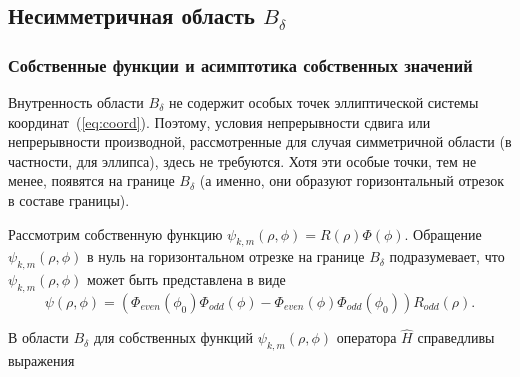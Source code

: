 \subsection{Несимметричная область $B_\delta$}\label{sec:ch2/sec2/sub2}
\subsubsection{Собственные функции и асимптотика собственных значений}\label{sec:ch2/sec2/sub2/sub1}


Внутренность области $B_\delta$ не содержит особых точек эллиптической системы координат~(\ref{eq:coord}). Поэтому, условия непрерывности сдвига или непрерывности производной, рассмотренные для случая симметричной области (в частности, для эллипса), здесь не требуются.
Хотя эти особые точки, тем не менее, появятся на границе  $B_\delta$ (а именно, они образуют горизонтальный отрезок в составе границы).

Рассмотрим собственную функцию $\psi_{k,m}(\rho,\phi) = R(\rho)\Phi(\phi)$.
Обращение  $\psi_{k,m}(\rho,\phi) $ в нуль на горизонтальном отрезке на границе  $B_\delta$
подразумевает, что $\psi_{k,m}(\rho,\phi)$ может быть представлена в виде
\[
\psi(\rho,\phi) = 
    \left(
    \Phi_{even}(\phi_0) \Phi_{odd}(\phi) - \Phi_{even}(\phi) \Phi_{odd}(\phi_0) 
    \right) R_{odd}(\rho).
\]

В области  $B_\delta$ для собственных функций $\psi_{k, m}(\rho, \phi)$ оператора $\hat{H}$ справедливы выражения

